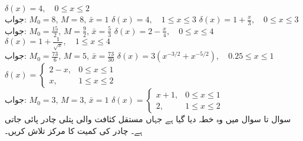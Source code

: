 $\delta(x)=4,\quad 0\le x\le 2$\\
جواب:\quad
$M_0=8,\,M=8,\,\bar{x}=1$
$\delta(x)=4,\quad 1\le x\le 3$
$\delta(x)=1+\frac{x}{3},\quad 0\le x\le 3$\\
جواب:\quad
$M_0=\tfrac{15}{2},\,M=\tfrac{9}{2},\,\bar{x}=\tfrac{5}{3}$
$\delta(x)=2-\frac{x}{4},\quad 0\le x\le 4$
$\delta(x)=1+\frac{1}{\sqrt{x}},\quad 1\le x\le 4$\\
جواب:\quad
$M_0=\tfrac{73}{6},\,M=5,\,\bar{x}=\tfrac{73}{30}$
$\delta(x)=3(x^{-3/2}+x^{-5/2}),\quad 0.25\le x\le 1$
$\delta(x)=\begin{cases} 2-x,&0\le x\le 1\\ x,&1\le x\le 2 \end{cases}$\\
جواب:\quad
$M_0=3,\,M=3,\,\bar{x}=1$
$\delta(x)=\begin{cases} x+1,&0\le x\le 1\\ 2,&1\le x\le 2 \end{cases}$
\\
سوال  تا سوال  میں وہ خطہ دیا گیا ہے جہاں مستقل کثافت  والی پتلی چادر پائی جاتی ہے۔ چادر کی کمیت کا مرکز تلاش کریں۔

